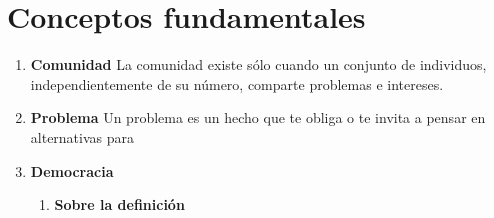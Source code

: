 \documentclass[10pt,letterpaper]{report}
\begin{document}
\section{Conceptos fundamentales}
	\begin{enumerate}

	\item {\bf Comunidad}	
La comunidad existe sólo cuando un conjunto de individuos, independientemente de su número, comparte problemas e intereses.
	
	\item {\bf Problema}
	Un problema es un hecho que te obliga o te invita a pensar en alternativas para 
	
	\item {\bf Democracia}
		\begin{enumerate}[label*=\arabic*.]
		\item {\bf Sobre la definición}
		

\end{enumerate}
\end{enumerate}
\end{document}
